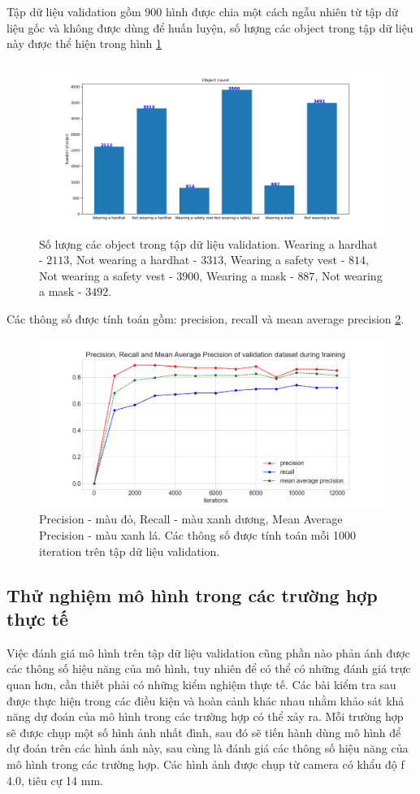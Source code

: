 Tập dữ liệu validation gồm $900$ hình được chia một cách ngẫu nhiên từ tập dữ liệu gốc và không được dùng để huấn luyện, số lượng các object trong tập dữ liệu này được thể hiện trong hình \ref{fig:validation_set}
\begin{figure}[ht!]
	\centerline{\includegraphics[scale=0.5]{images/validation_set.png}}
  	\caption{Số lượng các object trong tập dữ liệu validation. Wearing a hardhat - $2113$, Not wearing a hardhat - $3313$, Wearing a safety vest - $814$, Not wearing a safety vest - $3900$, Wearing a mask - $887$, Not wearing a mask - $3492$.}
  	\label{fig:validation_set}
\end{figure}

Các thông số được tính toán gồm: precision, recall và mean average precision \ref{fig:precision_recall_map}.
\begin{figure}[ht!]
	\centerline{\includegraphics[scale=0.5]{images/precision_recall_map.png}}
  	\caption{Precision - màu đỏ, Recall - màu xanh dương, Mean Average Precision - màu xanh lá. Các thông số được tính toán mỗi 1000 iteration trên tập dữ liệu validation.}
  	\label{fig:precision_recall_map}
\end{figure}

\subsection{Thử nghiệm mô hình trong các trường hợp thực tế}
Việc đánh giá mô hình trên tập dữ liệu validation cũng phần nào phản ánh được các thông số hiệu năng của mô hình, tuy nhiên để có thể có những đánh giá trực quan hơn, cần thiết phải có những kiểm nghiệm thực tế. Các bài kiểm tra sau được thực hiện trong các điều kiện và hoàn cảnh khác nhau nhằm khảo sát khả năng dự đoán của mô hình trong các trường hợp có thể xảy ra. Mỗi trường hợp sẽ được chụp một số hình ảnh nhất đình, sau đó sẽ tiến hành dùng mô hình để dự đoán trên các hình ảnh này, sau cùng là đánh giá các thông số hiệu năng của mô hình trong các trường hợp. Các hình ảnh được chụp từ camera có khẩu độ f 4.0, tiêu cự 14 mm.

